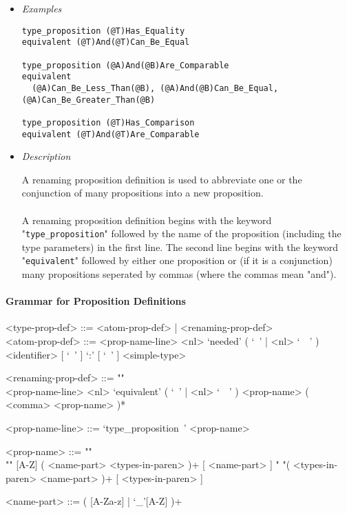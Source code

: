 \documentclass{article}
\begin{document}
\begin{itemize}
\item \textit{Examples}
\begin{verbatim}
type_proposition (@T)Has_Equality
equivalent (@T)And(@T)Can_Be_Equal

type_proposition (@A)And(@B)Are_Comparable
equivalent
  (@A)Can_Be_Less_Than(@B), (@A)And(@B)Can_Be_Equal, (@A)Can_Be_Greater_Than(@B)

type_proposition (@T)Has_Comparison
equivalent (@T)And(@T)Are_Comparable
\end{verbatim}

\item \textit{Description}

A renaming proposition definition is used to abbreviate one or the conjunction
of many propositions into a new proposition.
\\\\
A renaming proposition definition begins with the keyword
"\verb|type_proposition|" followed by the name of the proposition (including
the type parameters) in the first line. The second line begins with the keyword
"\verb|equivalent|" followed by either one proposition or (if it is a
conjunction) many propositions seperated by commas (where the commas
mean "and").

\end{itemize}

\paragraph{Grammar for Proposition Definitions}

\begin{grammar}
<type-prop-def> ::= <atom-prop-def> | <renaming-prop-def>
\\

<atom-prop-def> ::=
<prop-name-line> <nl> `needed' ( `\ ' | <nl> `\ \ ' )
<identifier> [ `\ ' ] `:' [ `\ ' ] <simple-type>

<renaming-prop-def> ::= ""\\
<prop-name-line> <nl>
`equivalent' ( `\ ' | <nl> `\ \ ' ) <prop-name> ( <comma> <prop-name> )*

<prop-name-line> ::= `type_proposition\ ' <prop-name>

<prop-name> ::=  ""\\""
[A-Z] ( <name-part> <types-in-paren> )+ [ <name-part> ]
\alt " "( <types-in-paren> <name-part> )+ [ <types-in-paren> ]

<name-part> ::= ( [A-Za-z] | `_'[A-Z] )+
\end{grammar}
\end{document}

